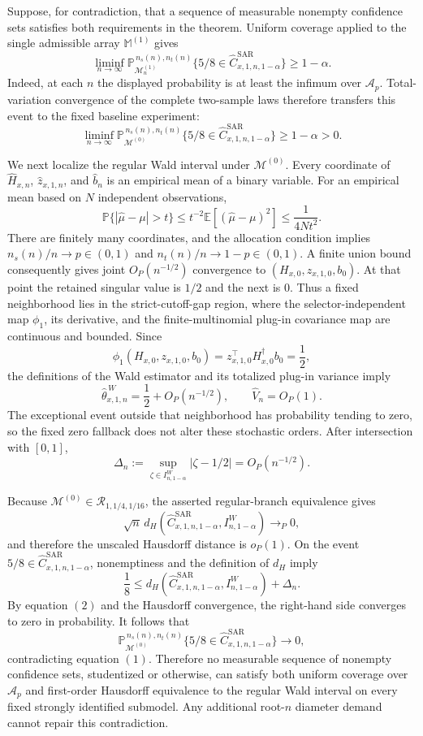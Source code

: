 Suppose, for contradiction, that a sequence of measurable nonempty confidence sets satisfies both requirements in the theorem.  Uniform coverage applied to the single admissible array \(\mathbb M^{(1)}\) gives
\[
\liminf_{n\to\infty}
\mathbb P_{\mathcal M_n^{(1)}}^{\,n_s(n),n_t(n)}
\{5/8\in\widehat C^{\mathrm{SAR}}_{x,1,n,1-\alpha}\}
\ge1-\alpha.
\]
Indeed, at each \(n\) the displayed probability is at least the infimum over \(\mathcal A_p\).  Total-variation convergence of the complete two-sample laws therefore transfers this event to the fixed baseline experiment:
\[
\liminf_{n\to\infty}
\mathbb P_{\mathcal M^{(0)}}^{\,n_s(n),n_t(n)}
\{5/8\in\widehat C^{\mathrm{SAR}}_{x,1,n,1-\alpha}\}
\ge1-\alpha>0. \tag{1}
\]

We next localize the regular Wald interval under \(\mathcal M^{(0)}\).  Every coordinate of \(\widehat H_{x,n}\), \(\widehat z_{x,1,n}\), and \(\widehat b_n\) is an empirical mean of a binary variable.  For an empirical mean based on \(N\) independent observations,
\[
\mathbb P\{|\widehat\mu-\mu|>t\}
\le t^{-2}\mathbb E[(\widehat\mu-\mu)^2]
\le\frac1{4Nt^2}.
\]
There are finitely many coordinates, and the allocation condition implies \(n_s(n)/n\to p\in(0,1)\) and \(n_t(n)/n\to1-p\in(0,1)\).  A finite union bound consequently gives joint \(O_P(n^{-1/2})\) convergence to \((H_{x,0},z_{x,1,0},b_0)\).  At that point the retained singular value is \(1/2\) and the next is \(0\).  Thus a fixed neighborhood lies in the strict-cutoff-gap region, where the selector-independent map \(\phi_1\), its derivative, and the finite-multinomial plug-in covariance map are continuous and bounded.  Since
\[
\phi_1(H_{x,0},z_{x,1,0},b_0)
=z_{x,1,0}^{\top}H_{x,0}^{\dagger}b_0=\frac12,
\]
the definitions of the Wald estimator and its totalized plug-in variance imply
\[
\widehat\theta^{\,W}_{x,1,n}=\frac12+O_P(n^{-1/2}),
\qquad
\widehat V_n=O_P(1).
\]
The exceptional event outside that neighborhood has probability tending to zero, so the fixed zero fallback does not alter these stochastic orders.  After intersection with \([0,1]\),
\[
\Delta_n:=\sup_{\zeta\in I^W_{n,1-\alpha}}|\zeta-1/2|
=O_P(n^{-1/2}). \tag{2}
\]

Because \(\mathcal M^{(0)}\in\mathcal R_{1,1/4,1/16}\), the asserted regular-branch equivalence gives
\[
\sqrt n\,d_H\!\left(
\widehat C^{\mathrm{SAR}}_{x,1,n,1-\alpha},I^W_{n,1-\alpha}
\right)\longrightarrow_P0,
\]
and therefore the unscaled Hausdorff distance is \(o_P(1)\).  On the event
\(5/8\in\widehat C^{\mathrm{SAR}}_{x,1,n,1-\alpha}\), nonemptiness and the definition of \(d_H\) imply
\[
\frac18
\le d_H\!\left(
\widehat C^{\mathrm{SAR}}_{x,1,n,1-\alpha},I^W_{n,1-\alpha}
\right)+\Delta_n.
\]
By equation \((2)\) and the Hausdorff convergence, the right-hand side converges to zero in probability.  It follows that
\[
\mathbb P_{\mathcal M^{(0)}}^{\,n_s(n),n_t(n)}
\{5/8\in\widehat C^{\mathrm{SAR}}_{x,1,n,1-\alpha}\}
\longrightarrow0,
\]
contradicting equation \((1)\).  Therefore no measurable sequence of nonempty confidence sets, studentized or otherwise, can satisfy both uniform coverage over \(\mathcal A_p\) and first-order Hausdorff equivalence to the regular Wald interval on every fixed strongly identified submodel.  Any additional root-\(n\) diameter demand cannot repair this contradiction.

